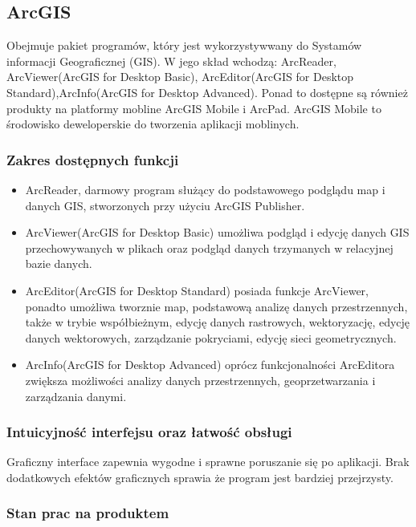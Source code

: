 \documentclass[11pt,a4paper]{article}
\begin{document}
\subsection{ArcGIS}

Obejmuje pakiet programów, który jest wykorzystywwany do Systamów informacji Geograficznej (GIS). W jego skład wchodzą: ArcReader, ArcViewer(ArcGIS for Desktop Basic), ArcEditor(ArcGIS for Desktop Standard),ArcInfo(ArcGIS for Desktop Advanced). Ponad to dostępne są również produkty na platformy mobline  ArcGIS Mobile i ArcPad.
ArcGIS Mobile to środowisko deweloperskie do tworzenia aplikacji moblinych.

\subsubsection*{Zakres dostępnych funkcji}

\begin{itemize}

	\item ArcReader, darmowy program służący do podstawowego podglądu map i danych GIS, stworzonych przy użyciu ArcGIS Publisher.
	\item ArcViewer(ArcGIS for Desktop Basic) umożliwa podgląd i edycję danych GIS przechowywanych w plikach oraz podgląd danych trzymanych w relacyjnej bazie danych.
	\item ArcEditor(ArcGIS for Desktop Standard) posiada funkcje ArcViewer, ponadto umożliwa tworznie map, podstawową analizę danych przestrzennych, także w trybie współbieżnym, edycję danych rastrowych, wektoryzację, edycję danych wektorowych, zarządzanie pokryciami, edycję sieci geometrycznych.
	\item ArcInfo(ArcGIS for Desktop Advanced) oprócz funkcjonalności ArcEditora zwiększa możliwości analizy danych przestrzennych, geoprzetwarzania i zarządzania danymi.
\end{itemize}

\subsubsection*{Intuicyjność interfejsu oraz łatwość obsługi}

Graficzny interface zapewnia wygodne i sprawne poruszanie się po aplikacji. Brak dodatkowych efektów graficznych sprawia że program jest bardziej przejrzysty.

\subsubsection*{Stan prac na produktem}
\end{document}
